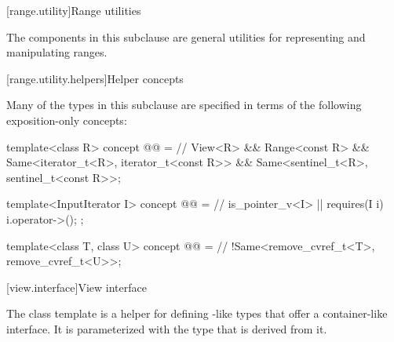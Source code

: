 [range.utility]{Range utilities}

\pnum
The components in this subclause are general utilities for representing and
manipulating ranges.

[range.utility.helpers]{Helper concepts}

\pnum
Many of the types in this subclause are specified in terms of
the following exposition-only concepts:

\begin{codeblock}
template<class R>
  concept @@ =                         // \expos
    View<R> && Range<const R> &&
    Same<iterator_t<R>, iterator_t<const R>> &&
    Same<sentinel_t<R>, sentinel_t<const R>>;

template<InputIterator I>
  concept @@ =                           // \expos
    is_pointer_v<I> || requires(I i) { i.operator->(); };

template<class T, class U>
  concept @@ =                         // \expos
    !Same<remove_cvref_t<T>, remove_cvref_t<U>>;
\end{codeblock}

[view.interface]{View interface}

\pnum
The class template  is a helper for defining
-like types that offer a container-like interface. It is
parameterized with the type that is derived from it.

